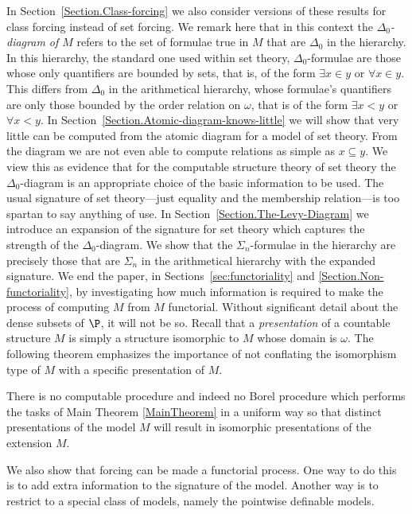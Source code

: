 \documentclass{amsart}
\begin{document}
In Section~\ref{Section.Class-forcing} we also consider versions of these results for class forcing instead of set forcing.
We remark here that in this context the \emph{$\Delta_0$-diagram of $M$} refers to the set of formulae true in $M$ that are $\Delta_0$ in the \Levy{} hierarchy. In this hierarchy, the standard one used within set theory, $\Delta_0$-formulae are those whose only quantifiers are bounded by sets, that is, of the form $\exists x \in y$ or $\forall x \in y$. This differs from $\Delta_0$ in the arithmetical hierarchy, whose formulae's quantifiers are only those bounded by the order relation on $\omega$, that is of the form $\exists x < y$ or $\forall x < y$. In Section~\ref{Section.Atomic-diagram-knows-little} we will show that very little can be computed from the atomic diagram for a model of set theory. From the diagram we are not even able to compute relations as simple as $x \subseteq y$. We view this as evidence that for the computable structure theory of set theory the \Levy{} $\Delta_0$-diagram is an appropriate choice of the basic information to be used. The usual signature of set theory---just equality and the membership relation---is too spartan to say anything of use. In Section~\ref{Section.The-Levy-Diagram} we introduce an expansion of the signature for set theory which captures the strength of the \Levy{} $\Delta_0$-diagram. We show that the $\Sigma_n$-formulae in the \Levy{} hierarchy are precisely those that are $\Sigma_n$ in the arithmetical hierarchy with the expanded signature.
We end the paper, in Sections~\ref{sec:functoriality} and \ref{Section.Non-functoriality}, by investigating how much
information is required to make the process of computing $M$ from $M$ functorial.
Without significant detail
about the dense subsets of $\P$, it will not be so.
Recall that a \emph{presentation} of a countable structure $M$
is simply a structure isomorphic to $M$ whose domain is $\omega$.
The following theorem emphasizes the importance of not conflating the isomorphism type of $M$ with a specific presentation of $M$.
\begin{maintheorem}\label{MainTheorem.Nonfunctoriality}
There is no computable procedure and indeed no Borel procedure which performs the tasks of Main Theorem \ref{MainTheorem} in a uniform way so that distinct presentations of the model $M$ will result in isomorphic presentations of the extension $M$.
\end{maintheorem}
We also show that forcing can be made a functorial process. One way to do this is to add extra information to the signature of the model. Another way is to restrict to a special class of models, namely the pointwise definable models.
\end{document}
